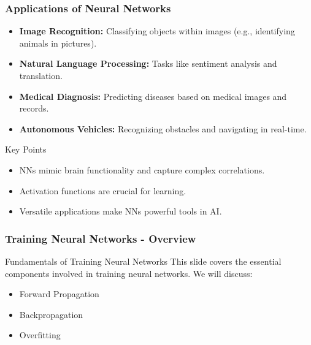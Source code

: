 \documentclass[aspectratio=169]{beamer}
\begin{document}
\begin{frame}[fragile]
    \frametitle{Applications of Neural Networks}
    \begin{itemize}
        \item \textbf{Image Recognition:} Classifying objects within images (e.g., identifying animals in pictures).
        \item \textbf{Natural Language Processing:} Tasks like sentiment analysis and translation.
        \item \textbf{Medical Diagnosis:} Predicting diseases based on medical images and records.
        \item \textbf{Autonomous Vehicles:} Recognizing obstacles and navigating in real-time.
    \end{itemize}
    
    \begin{block}{Key Points}
        \begin{itemize}
            \item NNs mimic brain functionality and capture complex correlations.
            \item Activation functions are crucial for learning.
            \item Versatile applications make NNs powerful tools in AI.
        \end{itemize}
    \end{block}
\end{frame}

\begin{frame}[fragile]
    \frametitle{Training Neural Networks - Overview}
    \begin{block}{Fundamentals of Training Neural Networks}
        This slide covers the essential components involved in training neural networks. We will discuss:
        \begin{itemize}
            \item Forward Propagation
            \item Backpropagation
            \item Overfitting
        \end{itemize}
    \end{block}
\end{frame}
\end{document}
